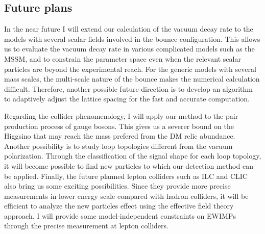\documentclass[12pt,notitlepage]{book}
\def\rem#1{ {\bf\textcolor{red}{($\clubsuit$ #1 $\clubsuit$)}}}
\begin{document}




\vspace*{-2mm}
\subsection*{Future plans}

In the near future I will extend our calculation of the vacuum decay
rate to the models with several scalar fields involved in the bounce
configuration.  This allows us to evaluate the vacuum decay rate in
various complicated models such as the MSSM, and to constrain the
parameter space even when the relevant scalar particles are beyond the
experimental reach.  For the generic models with several mass scales,
the multi-scale nature of the bounce makes the numerical calculation
difficult.  Therefore, another possible future direction is to develop
an algorithm to adaptively adjust the lattice spacing for the fast and
accurate computation.

Regarding the collider phenomenology, I will apply our method to the
pair production process of gauge bosons.  This gives us a severer bound
on the Higgsino that may reach the mass prefered from the DM relic
abundance.  Another possibility is to study loop topologies different
from the vacuum polarization.  Through the classification of the signal
shape for each loop topology, it will become possible to find new
particles to which our detection method can be applied.  Finally, the
future planned lepton colliders such as ILC and CLIC also bring us some
exciting possibilities.  Since they provide more precise measurements in
lower energy scale compared with hadron colliders, it will be efficient
to analyze the new particles effect using the effective field theory
approach.  I will provide some model-independent constraints on EWIMPs
through the precise measurement at lepton colliders.
\end{document}
